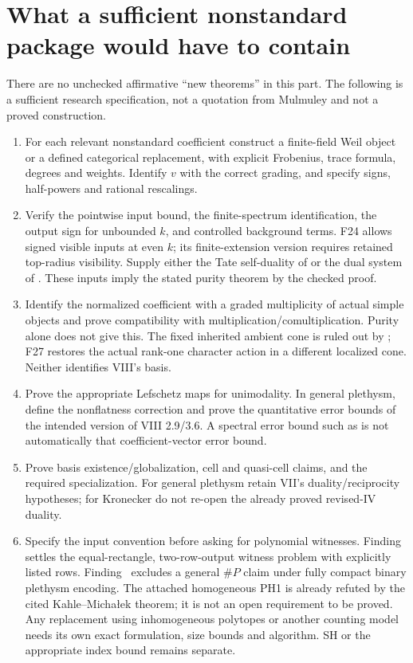 \section{What a sufficient nonstandard package would have to contain}\label{sec:gates}
There are no unchecked affirmative ``new theorems'' in this part. The following is a sufficient research specification, not a quotation from Mulmuley and not a proved construction.

\begin{enumerate}
\item {} For each relevant nonstandard coefficient construct a finite-field Weil object or a defined categorical replacement, with explicit Frobenius, trace formula, degrees and weights. Identify $v$ with the correct grading, and specify signs, half-powers and rational rescalings.
\item {} Verify the pointwise input bound, the finite-spectrum identification, the output sign for unbounded $k$, and controlled background terms. F24 allows signed visible inputs at even $k$; its finite-extension version requires retained top-radius visibility. Supply either the Tate self-duality of  or the dual system of . These inputs imply the stated purity theorem by the checked proof.
\item {} Identify the normalized coefficient with a graded multiplicity of actual simple objects and prove compatibility with multiplication/comultiplication. Purity alone does not give this. The fixed inherited ambient cone is ruled out by ; F27 restores the actual rank-one character action in a different localized cone. Neither identifies VIII's basis.
\item {} Prove the appropriate Lefschetz maps for unimodality. In general plethysm, define the nonflatness correction and prove the quantitative error bounds of the intended version of VIII 2.9/3.6. A spectral error bound such as  is not automatically that coefficient-vector error bound.
\item {} Prove basis existence/globalization, cell and quasi-cell claims, and the required specialization. For general plethysm retain VII's duality/reciprocity hypotheses; for Kronecker do not re-open the already proved revised-IV duality.
\item {} Specify the input convention before asking for polynomial witnesses. Finding~ settles the equal-rectangle, two-row-output witness problem with explicitly listed rows. Finding~ excludes a general \(\#P\) claim under fully compact binary plethysm encoding. The attached homogeneous PH1 is already refuted by the cited Kahle--Micha{\l}ek theorem; it is not an open requirement to be proved. Any replacement using inhomogeneous polytopes or another counting model needs its own exact formulation, size bounds and algorithm. SH or the appropriate index bound remains separate.

\end{enumerate}
